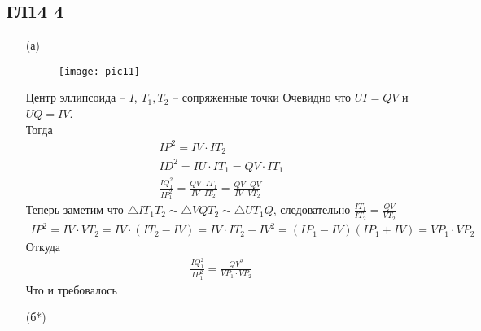 \subsection*{ГЛ14 4}
\begin{enumerate}
\item[(а)]
	\begin{figure}[h]
		\texttt{[image: pic11]}
	\end{figure}
	Центр эллипсоида -- $I$, $T_1, T_2$ -- сопряженные точки
	Очевидно что $UI = QV$ и $UQ = IV$.\\
	Тогда
	\begin{gather*}
		IP^{2} = IV \cdot IT_2\\
		ID^{2} = IU \cdot IT_1 = QV \cdot IT_1\\
		\frac{IQ_1^2}{IP_1^2} = \frac{QV \cdot IT_1}{IV \cdot IT_2} = \frac{QV \cdot QV}{IV \cdot VT_2}
	\end{gather*}
	Теперь заметим что $\triangle IT_1T_2 \sim \triangle VQT_2 \sim \triangle UT_1Q$, следовательно $\frac{IT_1}{IT_2} = \frac{QV}{VT_2}$
	\begin{gather*}
		IP^2 = IV \cdot VT_2 = IV \cdot (IT_2 - IV) = IV \cdot IT_2 - IV^{2} = (IP_1 - IV)(IP_1 + IV) = VP_1 \cdot VP_2
	\end{gather*}
	Откуда
	\begin{gather*}
		\frac{IQ_1^2}{IP_1^2} = \frac{QV^2}{VP_1 \cdot VP_2}
	\end{gather*}
	Что и требовалось
\item[(б*)] 
\end{enumerate}
	